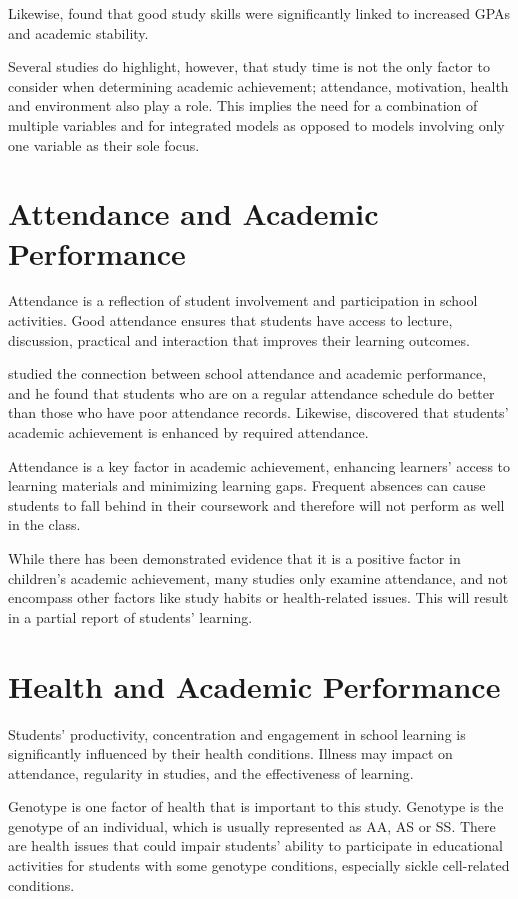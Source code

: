 \documentclass[12pt]{report}
\begin{document}
	Likewise, \citet{Crede2008} found that good study skills were significantly linked to increased GPAs and academic stability.
	
	Several studies do highlight, however, that study time is not the only factor to consider when determining academic achievement; attendance, motivation, health and environment also play a role. This implies the need for a combination of multiple variables and for integrated models as opposed to models involving only one variable as their sole focus.
	\section{Attendance and Academic Performance}
	Attendance is a reflection of student involvement and participation in school activities. Good attendance ensures that students have access to lecture, discussion, practical and interaction that improves their learning outcomes.
	
	\citet{Romer1993} studied the connection between school attendance and academic performance, and he found that students who are on a regular attendance schedule do better than those who have poor attendance records. Likewise, \citet{Marburger2006} discovered that students' academic achievement is enhanced by required attendance.
	
	Attendance is a key factor in academic achievement, enhancing learners' access to learning materials and minimizing learning gaps. Frequent absences can cause students to fall behind in their coursework and therefore will not perform as well in the class.
	
	While there has been demonstrated evidence that it is a positive factor in children's academic achievement, many studies only examine attendance, and not encompass other factors like study habits or health-related issues. This will result in a partial report of students' learning.
	\section{Health and Academic Performance}
	Students' productivity, concentration and engagement in school learning is significantly influenced by their health conditions. Illness may impact on attendance, regularity in studies, and the effectiveness of learning.
	
	Genotype is one factor of health that is important to this study. Genotype is the genotype of an individual, which is usually represented as AA, AS or SS. There are health issues that could impair students' ability to participate in educational activities for students with some genotype conditions, especially sickle cell-related conditions.
	
\end{document}
